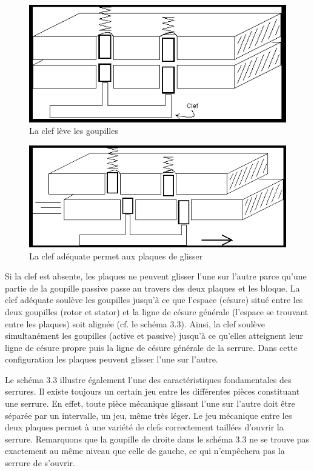 \documentclass[a4paper,french,11pt,twoside]{report}
\begin{document}
\begin{figure}[h] \begin{center}
        \includegraphics[width=16cm]{images/image3_serrure.png}
        \caption{La clef lève les goupilles}
\end{center} \end{figure}

\begin{figure}[h] \begin{center}
        \includegraphics[width=16cm]{images/image5.png}
        \caption{La clef adéquate permet aux plaques de glisser}
\end{center} \end{figure}

Si la clef est absente, les plaques ne peuvent glisser l'une sur l'autre parce qu'une partie de la goupille passive passe au travers des deux plaques et les bloque. La clef adéquate soulève les goupilles jusqu'à ce que l'espace (césure) situé entre les deux goupilles (rotor et stator) et la ligne de césure générale (l'espace se trouvant entre les plaques) soit alignée (cf. le schéma 3.3). Ainsi, la clef soulève simultanément les goupilles (active et passive) jusqu'à ce qu'elles atteignent leur ligne de césure propre puis la ligne de césure générale de la serrure. Dans cette configuration les plaques peuvent glisser l'une sur l'autre.

Le schéma 3.3 illustre également l'une des caractéristiques fondamentales des serrures. Il existe toujours un certain jeu entre les différentes pièces constituant une serrure. En effet, toute pièce mécanique glissant l'une sur l'autre doit être séparée par un intervalle, un jeu, même très léger. Le jeu mécanique entre les deux plaques permet à une variété de clefs correctement taillées d'ouvrir la serrure. Remarquons que la goupille de droite dans le schéma 3.3 ne se trouve pas exactement au même niveau que celle de gauche, ce qui n'empêchera pas la serrure de s'ouvrir.
\end{document}
